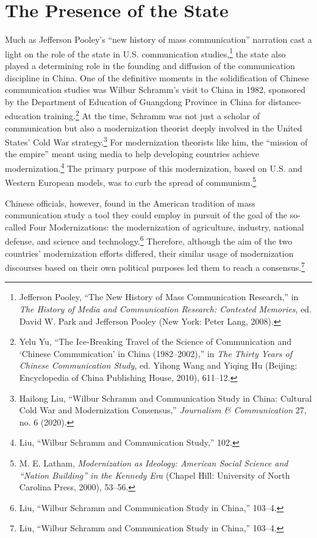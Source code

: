\documentclass{tufte-handout}
\begin{document}
\enlargethispage{1\baselineskip}

\hypertarget{the-presence-of-the-state}{%
\section{The Presence of the State}\label{the-presence-of-the-state}}

Much as Jefferson Pooley's ``new history of mass communication''
narration cast a light on the role of the state in U.S. communication
studies,\footnote{Jefferson Pooley, ``The New History of Mass
  Communication Research,'' in \emph{The History of Media and
  Communication Research: Contested Memories}, ed. David W. Park and
  Jefferson Pooley (New York: Peter Lang, 2008).} the state also played
a determining role in the founding and diffusion of the communication
discipline in China. One of the definitive moments in the solidification
of Chinese communication studies was Wilbur Schramm's visit to China in
1982, sponsored by the Department of Education of Guangdong Province in
China for distance-education training.\footnote{Yelu Yu, ``The
  Ice-Breaking Travel of the Science of Communication and `Chinese
  Communication' in China (1982--2002),'' in \emph{The Thirty Years of
  Chinese Communication Study}, ed. Yihong Wang and Yiqing Hu (Beijing:
  Encyclopedia of China Publishing House, 2010), 611--12.} At the time,
Schramm was not just a scholar of communication but also a modernization
theorist deeply involved in the United States' Cold War
strategy.\footnote{Hailong Liu, ``Wilbur Schramm and Communication Study
  in China: Cultural Cold War and Modernization Consensus,''
  \emph{Journalism \& Communication} 27, no. 6 (2020).} For
modernization theorists like him, the ``mission of the empire'' meant
using media to help developing countries achieve
modernization.\footnote{Liu, ``Wilbur Schramm and Communication Study,''
  102.} The primary purpose of this modernization, based on U.S. and
Western European models, was to curb the spread of communism.\footnote{M.
  E. Latham, \emph{Modernization as Ideology: American Social Science
  and ``Nation Building'' in the Kennedy Era} (Chapel Hill: University
  of North Carolina Press, 2000), 53--56.}

Chinese officials, however, found in the American tradition of mass
communication study a tool they could employ in pursuit of the goal of
the so-called Four Modernizations: the modernization of agriculture,
industry, national defense, and science and technology.\footnote{Liu,
  ``Wilbur Schramm and Communication Study in China,'' 103--4.}
Therefore, although the aim of the two countries' modernization efforts
differed, their similar usage of modernization discourses based on their
own political purposes led them to reach a consensus.\footnote{Liu,
  ``Wilbur Schramm and Communication Study in China,'' 103--4.}
\end{document}
